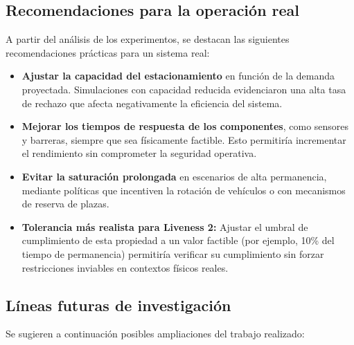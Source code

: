 \documentclass[12pt]{article}
\begin{document}
\subsection{Recomendaciones para la operación real}

A partir del análisis de los experimentos, se destacan las siguientes recomendaciones prácticas para un sistema real:

\begin{itemize}
    \item \textbf{Ajustar la capacidad del estacionamiento} en función de la demanda proyectada. Simulaciones con capacidad reducida evidenciaron una alta tasa de rechazo que afecta negativamente la eficiencia del sistema.

    \item \textbf{Mejorar los tiempos de respuesta de los componentes}, como sensores y barreras, siempre que sea físicamente factible. Esto permitiría incrementar el rendimiento sin comprometer la seguridad operativa.

    \item \textbf{Evitar la saturación prolongada} en escenarios de alta permanencia, mediante políticas que incentiven la rotación de vehículos o con mecanismos de reserva de plazas.

    \item \textbf{Tolerancia más realista para Liveness 2:} Ajustar el umbral de cumplimiento de esta propiedad a un valor factible (por ejemplo, 10\% del tiempo de permanencia) permitiría verificar su cumplimiento sin forzar restricciones inviables en contextos físicos reales.
\end{itemize}

\subsection{Líneas futuras de investigación}

Se sugieren a continuación posibles ampliaciones del trabajo realizado:
\end{document}
